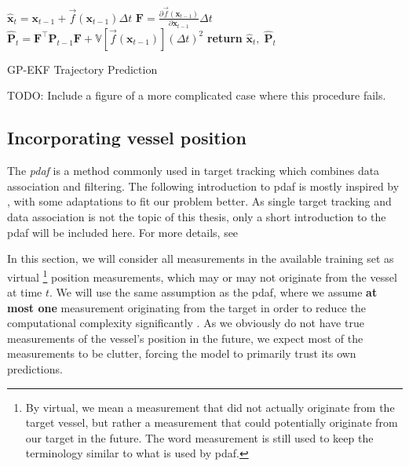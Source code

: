 \begin{algorithm}[h]
    \begin{algorithmic}[1]
        \State $\hat{\boldsymbol{x}}_{t} = \boldsymbol{x}_{t-1} + \vec{f}(\boldsymbol{x}_{t-1}) \Delta t$
        \State $\boldsymbol{F} = \frac{\partial \vec{f}(\boldsymbol{x}_{t-1})}{\partial \boldsymbol{x}_{t-1}} \Delta t$
        \State $\hat{\boldsymbol{P}}_t = \boldsymbol{F}^\intercal \boldsymbol{P}_{t-1} \boldsymbol{F} +\mathbb{V}[\vec{f}(\boldsymbol{x}_{t-1})] (\Delta t)^2$
        \State \textbf{return} $\hat{\boldsymbol{x}}_t, \; \hat{\boldsymbol{P}}_t$
        \EndProcedure
    \end{algorithmic}
    \caption{GP-EKF Trajectory Prediction}
    \label{alg:gp_ekf_prediction}
\end{algorithm}

TODO: Include a figure of a more complicated case where this procedure fails.

\subsection{Incorporating vessel position}
The \textit{\acrfull{pdaf}} is a method commonly used in target tracking which combines data association and filtering. The following introduction to \acrshort{pdaf} is mostly inspired by \cite{sensorfusjon}, with some adaptations to fit our problem better. As single target tracking and data association is not the topic of this thesis, only a short introduction to the \acrshort{pdaf} will be included here. For more details, see \cite{sensorfusjon,bar1995multitarget}

In this section, we will consider all measurements in the available training set as virtual \footnote{By virtual, we mean a measurement that did not actually originate from the target vessel, but rather a measurement that could potentially originate from our target in the future. The word measurement is still used to keep the terminology similar to what is used by \acrshort{pdaf}.} position measurements, which may or may not originate from the vessel at time $t$. We will use the same assumption as the \acrshort{pdaf}, where we assume \textbf{at most one} measurement originating from the target in order to reduce the computational complexity significantly \cite{sensorfusjon}. As we obviously do not have true measurements of the vessel's position in the future, we expect most of the measurements to be clutter, forcing the model to primarily trust its own predictions. 

